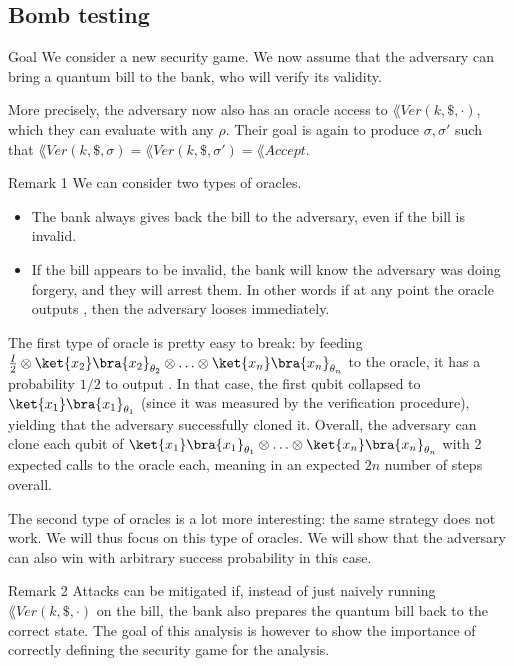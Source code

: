 \documentclass[a4paper]{article}
\begin{document}
\subsection{Bomb testing}

\begin{parag}{Goal}
    We consider a new security game. We now assume that the adversary can bring a quantum bill to the bank, who will verify its validity. 

    More precisely, the adversary now also has an oracle access to $\lang{Ver}\left(k, \$, \cdot\right)$, which they can evaluate with any $\rho$. Their goal is again to produce $\sigma, \sigma'$ such that $\lang{Ver}\left(k, \$, \sigma\right) = \lang{Ver}\left(k, \$, \sigma'\right) = \lang{Accept}$.

    \begin{subparag}{Remark 1}
        We can consider two types of oracles.
        \begin{itemize}
            \item The bank always gives back the bill to the adversary, even if the bill is invalid.
            \item If the bill appears to be invalid, the bank will know the adversary was doing forgery, and they will arrest them. In other words if at any point the oracle outputs , then the adversary looses immediately.
        \end{itemize}
        
        The first type of oracle is pretty easy to break: by feeding $\frac{I}{2} \otimes \ket{x_2}\bra{x_2}_{\theta_2} \otimes \ldots \otimes \ket{x_n}\bra{x_n}_{\theta_n}$ to the oracle, it has a probability $1/2$ to output . In that case, the first qubit collapsed to $\ket{x_1}\bra{x_1}_{\theta_1}$ (since it was measured by the verification procedure), yielding that the adversary successfully cloned it. Overall, the adversary can clone each qubit of $\ket{x_1}\bra{x_1}_{\theta_1} \otimes \ldots \otimes \ket{x_n}\bra{x_n}_{\theta_n}$ with 2 expected calls to the oracle each, meaning in an expected $2n$ number of steps overall.

        The second type of oracles is a lot more interesting: the same strategy does not work. We will thus focus on this type of oracles. We will show that the adversary can also win with arbitrary success probability in this case. 
    \end{subparag}
    
    \begin{subparag}{Remark 2}
        Attacks can be mitigated if, instead of just naively running $\lang{Ver}\left(k, \$, \cdot \right)$ on the bill, the bank also prepares the quantum bill back to the correct state. The goal of this analysis is however to show the importance of correctly defining the security game for the analysis.
    \end{subparag}
\end{parag}
\end{document}
